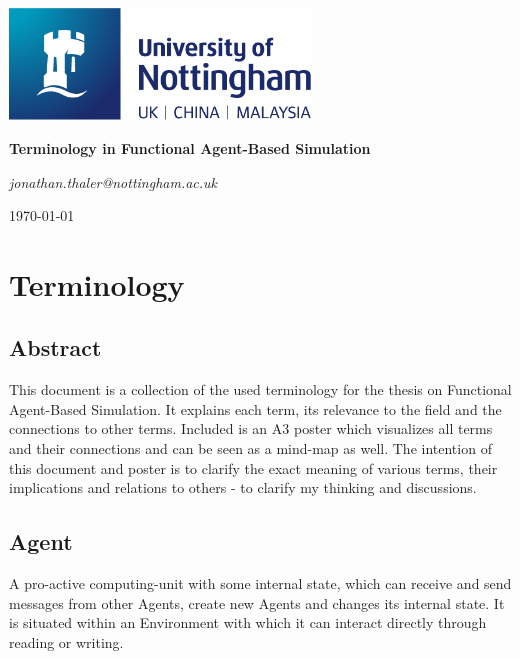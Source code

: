 \documentclass[oneside]{book}
\begin{document}
\begin{titlepage}
	\centering
	\includegraphics[width=0.60\textwidth]{../logo/UoN_Primary_Logo_RGB.png}\par\vspace{1cm}
	\vspace{1.5cm}
	{\huge\bfseries Terminology in Functional Agent-Based Simulation \par}
	\vspace{2cm}
	{\Large\itshape jonathan.thaler@nottingham.ac.uk \par}
	\vfill
	
	\vfill

	{\large \today\par}
\end{titlepage}

\cleardoublepage

\chapter{Terminology}

\section*{Abstract}
This document is a collection of the used terminology for the thesis on Functional Agent-Based Simulation. It explains each term, its relevance to the field and the connections to other terms. Included is an A3 poster which visualizes all terms and their connections and can be seen as a mind-map as well.
The intention of this document and poster is to clarify the exact meaning of various terms, their implications and relations to others - to clarify my thinking and discussions.


\clearpage

\section*{Agent}
A pro-active computing-unit with some internal state, which can receive and send messages from other Agents, create new Agents and changes its internal state. It is situated within an Environment with which it can interact directly through reading or writing.
\end{document}
